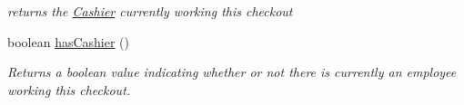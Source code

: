 \begin{CompactItemize}
\begin{CompactList}\small\item\em returns the \hyperlink{class_cashier}{Cashier} currently working this checkout \item\end{CompactList}\item 
\hypertarget{class_checkout_45374e5185ff75a871a1500c9f3e37e9}{
boolean \hyperlink{class_checkout_45374e5185ff75a871a1500c9f3e37e9}{hasCashier} ()}
\label{class_checkout_45374e5185ff75a871a1500c9f3e37e9}

\begin{CompactList}\small\item\em Returns a boolean value indicating whether or not there is currently an employee working this checkout. \item\end{CompactList}\end{CompactItemize}
